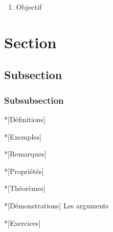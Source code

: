 \documentclass[
    12pt
]{PrRJtrace}
\begin{document}
\titreChapitre{}

\begin{objectifs}
    \begin{enumerate}
        \item Objectif
    \end{enumerate}
\end{objectifs}

\section{Section}

\subsection{Subsection}

\subsubsection{Subsubsection}

\begin{definition}*[Définitions]
    
\end{definition}

\begin{exemple}*[Exemples]
    
\end{exemple}

\begin{remarque}*[Remarques]
    
\end{remarque}

\begin{propriete}*[Propriétés]
    
\end{propriete}

\begin{theoreme}*[Théorèmes]
    
\end{theoreme}

\begin{demonstration}*[Démonstrations]
    Les arguments
    
    \CQFD
\end{demonstration}

\begin{exercice}*[Exercices]
    
\end{exercice}




\end{document}
